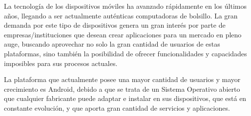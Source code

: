 \begin{comment}
Requisitos del proyecto y los problemas a encarar
Razón de ser del proyecto: aplicación, investigación, etc.
Especificaciones generales del proyecto.


introducción es una sección inicial que establece el propósito y los objetivos de todo el contenido posterior del escrito. En general va seguido del cuerpo o desarrollo del tema, y de las conclusiones.

En la introducción normalmente se describe el alcance del documento, y se da una breve explicación o resumen de éste. También puede explicar algunos antecedentes que son importantes para el posterior desarrollo del tema central. Un lector al leer una introducción debería poder hacerse una idea sobre el contenido del texto, antes de comenzar su lectura propiamente dicha.

En artículos técnicos, la introducción generalmente incluye una o más subsecciones estándar, como lo son el resumen o síntesis, el prefacio y los agradecimientos. Alternativamente, la sección de introducción puede ser un capítulo más del trabajo en sí, dividido en las subsecciones anteriormente mencionadas. Cuando el libro se divide en capítulos numerados, por convención la introducción y cualquier otro asunto delante de las secciones de cuerpo o desarrollo no se enumeran (o se enumeran de manera distinta) y preceden al capítulo 1.

El concepto de introducción es independiente del contenido del documento al cual introduce. Siempre debe presentar el objeto o problema a desarrollar, ya este se trate de una especificación formal, un producto, un personaje o un ente cualquiera.
\end{comment}

La tecnología de los dispositivos móviles ha avanzado rápidamente en los últimos años, llegando a ser actualmente auténticas computadoras de bolsillo. La gran demanda por este tipo de dispositivos genera un gran interés por parte de empresas/instituciones que desean crear aplicaciones para un mercado en pleno auge, buscando aprovechar no solo la gran cantidad de usuarios de estas plataformas, sino también la posibilidad de ofrecer funcionalidades y capacidades imposibles para sus procesos actuales.

La plataforma que actualmente posee una mayor cantidad de usuarios y mayor crecimiento es Android, debido a que se trata de un Sistema Operativo abierto que cualquier fabricante puede adaptar e instalar en sus dispositivos, que está en constante evolución, y que aporta gran cantidad de servicios y aplicaciones. 

